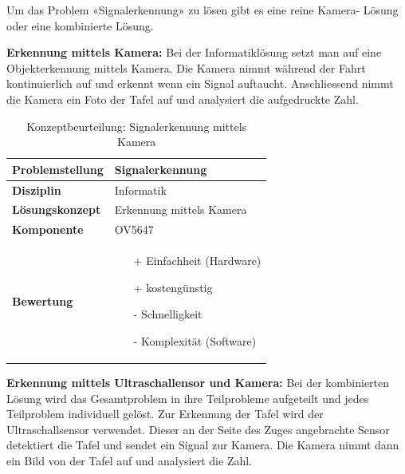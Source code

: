 \documentclass[../../../main.tex]{subfiles}
\begin{document}
    Um das Problem «Signalerkennung» zu lösen gibt es eine reine Kamera- Lösung oder eine kombinierte
    Lösung.

    \textbf{Erkennung mittels Kamera:}
    Bei der Informatiklösung setzt man auf eine Objekterkennung mittels Kamera. Die Kamera nimmt während der Fahrt
    kontinuierlich auf und erkennt wenn ein Signal auftaucht. Anschliessend nimmt die Kamera ein Foto der Tafel auf und
    analysiert die aufgedruckte Zahl. 

    \begin{flushleft}
        \begin{table}[H]
        \begin{tabular}{ | l | p{11cm} |}
        \hline
        \textbf{Problemstellung} & Signalerkennung \\ \hline
        \textbf{Disziplin} & Informatik \\ \hline
        \textbf{Lösungskonzept} & Erkennung mittels Kamera \\ \hline
        \textbf{Komponente} & OV5647 \\ \hline
        \textbf{Bewertung} &  \begin{itemize}
                                \item[+] Einfachheit (Hardware)
                                \item[+] kostengünstig
                                \item[-] Schnelligkeit
                                \item[-] Komplexität (Software)   
                              \end{itemize} \\ \hline
        \end{tabular}
        \caption{Konzeptbeurteilung: Signalerkennung mittels Kamera}
        \label{tab:konzept_wurfel_Stereokamera}
    \end{table}
    \end{flushleft}

    \textbf{Erkennung mittels Ultraschallensor und Kamera:}
    Bei der kombinierten Lösung wird das Gesamtproblem in ihre Teilprobleme aufgeteilt und jedes Teilproblem
    individuell gelöst. Zur Erkennung der Tafel wird der Ultraschallsensor verwendet. Dieser an der Seite des Zuges
    angebrachte Sensor detektiert die Tafel und sendet ein Signal zur Kamera. Die Kamera nimmt dann ein Bild von der Tafel
    auf und analysiert die Zahl.\\
\end{document}
